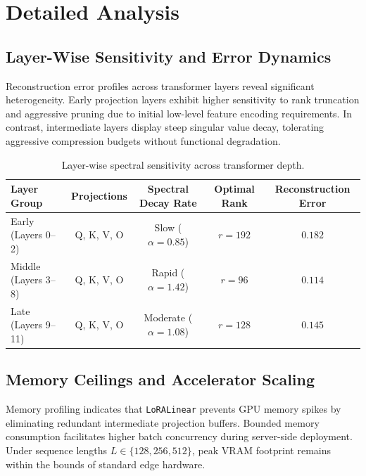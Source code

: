{\section{Detailed Analysis}

\subsection{Layer-Wise Sensitivity and Error Dynamics}
Reconstruction error profiles across transformer layers reveal significant heterogeneity. Early projection layers exhibit higher sensitivity to rank truncation and aggressive pruning due to initial low-level feature encoding requirements. In contrast, intermediate layers display steep singular value decay, tolerating aggressive compression budgets without functional degradation.

\begin{table}[H]
\centering
\small
\begin{tabular}{lcccc}
\toprule
\textbf{Layer Group} & \textbf{Projections} & \textbf{Spectral Decay Rate} & \textbf{Optimal Rank} & \textbf{Reconstruction Error} \\
\midrule
Early (Layers 0--2) & Q, K, V, O & Slow ($\alpha = 0.85$) & $r=192$ & $0.182$ \\
Middle (Layers 3--8) & Q, K, V, O & Rapid ($\alpha = 1.42$) & $r=96$ & $0.114$ \\
Late (Layers 9--11) & Q, K, V, O & Moderate ($\alpha = 1.08$) & $r=128$ & $0.145$ \\
\bottomrule
\end{tabular}
\caption{Layer-wise spectral sensitivity across transformer depth.}
\label{tab:layer_sensitivity}
\end{table}

\subsection{Memory Ceilings and Accelerator Scaling}
Memory profiling indicates that \texttt{LoRALinear} prevents GPU memory spikes by eliminating redundant intermediate projection buffers. Bounded memory consumption facilitates higher batch concurrency during server-side deployment. Under sequence lengths $L \in \{128, 256, 512\}$, peak VRAM footprint remains within the bounds of standard edge hardware.

}
